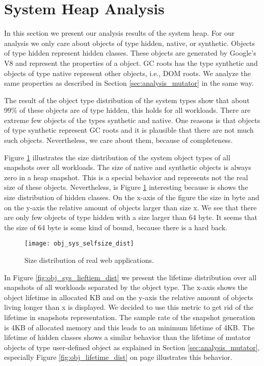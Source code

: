 
\section{System Heap Analysis}  \label{sec:analysis_system}

In this section we present our analysis results of the system heap. For our analysis we only care about objects of type hidden, native, or synthetic. Objects of type hidden represent hidden classes. These objects are generated by Google's V8 and represent the properties of a object. GC roots has the type synthetic and objects of type native represent other objects, i.e., DOM roots. We analyze the same properties as described in Section \ref{sec:analysis_mutator} in the same way.

The result of the object type distribution of the system types show that about 99\% of these objects are of type hidden, this holds for all workloads. There are extreme few objects of the types synthetic and native. One reasons is that objects of type synthetic represent GC roots and it is plausible that there are not much such objects. Nevertheless, we care about them, because of completeness.

Figure \ref{fig:obj_sys_selfsize_dist} illustrates the size distribution of the system object types of all snapshots over all workloads. The size of native and synthetic objects is always zero in a heap snapshot. This is a special behavior and represents not the real size of these objects. Nevertheless, is Figure \ref{fig:obj_sys_selfsize_dist} interesting because is shows the size distribution of hidden classes. On the x-axis of the figure the size in byte and on the y-axis the relative amount of objects larger than size x. We see that there are only few objects of type hidden with a size larger than 64 byte. It seems that the size of 64 byte is some kind of bound, because there is a hard back. 

\begin{figure}
	\centering
	\texttt{[image: obj\_sys\_selfsize\_dist]}
	\caption{Size distribution of real web applications.}
	\label{fig:obj_sys_selfsize_dist}
\end{figure}

In Figure \ref{fig:obj_sys_lieftiem_dist} we present the lifetime distribution over all snapshots of all workloads separated by the object type. The x-axis shows the object lifetime in allocated KB and on the y-axis the relative amount of objects living longer than x is displayed. We decided to use this metric to get rid of the lifetime in snapshots representation. The sample rate of the snapshot generation is 4KB of allocated memory and this leads to an minimum lifetime of 4KB. The lifetime of hidden classes shows a similar behavior than the lifetime of mutator objects of type user-defined object as explained in Section \ref{sec:analysis_mutator}, especially Figure \ref{fig:obj_lifetime_dist} on page \pageref{fig:obj_lifetime_dist} illustrates this behavior.

